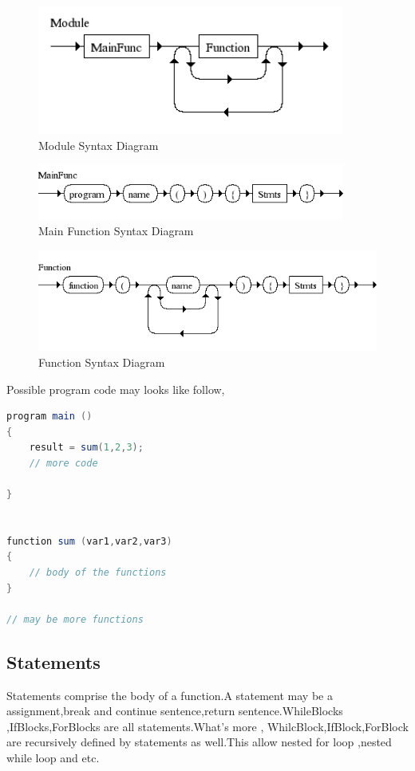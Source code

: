 \begin{figure}[h!]
  \centering
	\includegraphics[width=0.90\textwidth]{pic/c4/module.png}
	\caption{Module Syntax Diagram}
\end{figure}

\begin{figure}[h!]
  \centering
	\includegraphics[width=0.90\textwidth]{pic/c4/main_function.png}
	\caption{Main Function Syntax Diagram}
\end{figure}

\begin{figure}[h!]
  \centering
	\includegraphics[width=1.00\textwidth]{pic/c4/function.png}
	\caption{Function Syntax Diagram}
\end{figure}


Possible program code may looks like follow,

\begin{lstlisting}[language=java]
program main ()
{
 	result = sum(1,2,3);
 	// more code
 	
}


function sum (var1,var2,var3)
{
	// body of the functions
}

// may be more functions
\end{lstlisting}


\subsection{Statements}
Statements  comprise the body of a function.A statement may be a assignment,break and continue sentence,return sentence.WhileBlocks ,IfBlocks,ForBlocks are all statements.What's more , WhilcBlock,IfBlock,ForBlock are recursively defined by statements as well.This allow nested for loop ,nested while loop and etc.

